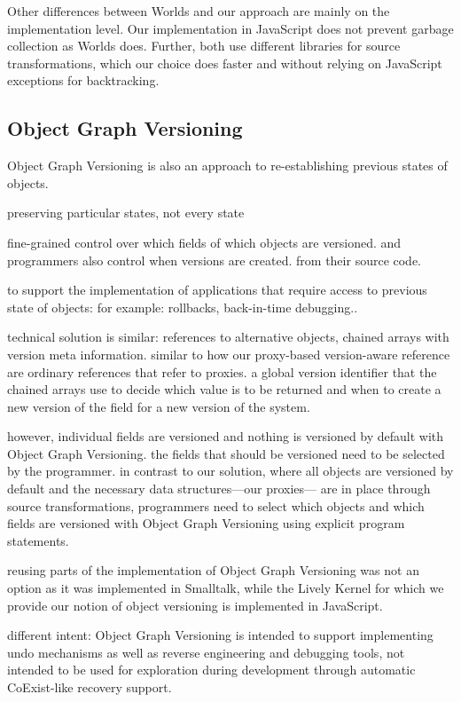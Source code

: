 Other differences between Worlds and our approach are mainly on the implementation level.
Our implementation in JavaScript does not prevent garbage collection as Worlds does.
Further, both use different libraries for source transformations, which our choice does faster and without relying on JavaScript exceptions for backtracking.


\subsection{Object Graph Versioning}


Object Graph Versioning\cite{Pluquet2009ECP} is also an approach to re-establishing previous states of objects.

preserving particular states, not every state

fine-grained control over which fields of which objects are versioned. and programmers also control when versions are created. from their source code.

to support the implementation of applications that require access to previous state of objects: for example: rollbacks, back-in-time debugging..

technical solution is similar: references to alternative objects, chained arrays with version meta information. similar to how our proxy-based version-aware reference are ordinary references that refer to proxies. 
a global version identifier that the chained arrays use to decide which value is to be returned and when to create a new version of the field for a new version of the system.

however, individual fields are versioned and nothing is versioned by default with Object Graph Versioning.
the fields that should be versioned need to be selected by the programmer.
in contrast to our solution, where all objects are versioned by default and the necessary data structures---our proxies--- are in place through source transformations, programmers need to select which objects and which fields are versioned with Object Graph Versioning using explicit program statements.

reusing parts of the implementation of Object Graph Versioning was not an option as it was implemented in Smalltalk, while the Lively Kernel for which we provide our notion of object versioning is implemented in JavaScript.

different intent: Object Graph Versioning is intended to support implementing undo mechanisms as well as reverse engineering and debugging tools, not intended to be used for exploration during development through automatic CoExist-like recovery support.

